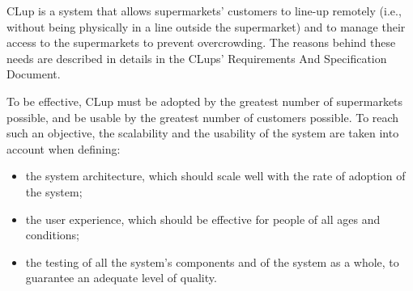 \documentclass[../../main.tex]{subfiles}
\begin{document}
CLup is a system that allows supermarkets' customers to line-up remotely
(i.e., without being physically in a line outside the supermarket) and to manage their access to the supermarkets to prevent overcrowding. The reasons behind these needs are described in details in the CLups' Requirements And Specification Document.

To be effective, CLup must be adopted by the greatest number of supermarkets possible, and be usable by the greatest number of customers possible. To reach such an objective, the scalability and the usability of the system are taken into account when defining:

\begin{itemize}
  \item the system architecture, which should scale well with the rate of adoption of the system;
  \item the user experience, which should be effective for people of all ages and conditions;
  \item the testing of all the system's components and of the system as a whole, to guarantee an adequate level of quality.
\end{itemize}
\end{document}
